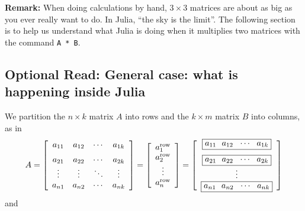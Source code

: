 \textbf{Remark:} When doing calculations by hand, $3 \times 3$ matrices are about as big as you ever really want to do. In Julia, ``the sky is the limit''. The following section is to help us understand what Julia is doing when it multiplies two matrices with the command \texttt{A * B}.

\subsection{Optional Read: General case: what is happening inside Julia}
We partition the $n \times k$ matrix $A$ into rows and the  $k \times m$ matrix $B$ into columns, as in 
\begin{equation}
   A= \left[\begin{array}{cccc} a_{11}& a_{12}& \cdots & a_{1k} \medskip \\
 a_{21}& a_{22}& \cdots & a_{2k}  \\
 \vdots & \vdots&  \ddots & \vdots \\
 a_{n1}& a_{n2}& \cdots & a_{nk} 
 \end{array}\right] = 
\left[\begin{array}{c} a_1^{\rm row}\\
a_2^{\rm row} \\
\vdots \\
a_n^{\rm row}\end{array}\right]  = \left[\begin{array}{c}\boxed{a_{11}~~ a_{12}~~ \cdots~~ a_{1k}}  \medskip \\
\boxed{a_{21}~~ a_{22}~~ \cdots~~ a_{2k}} \\
\vdots \\
\boxed{a_{n1}~~ a_{n2}~~ \cdots~~ a_{nk}}\end{array}\right]
\end{equation}
and
